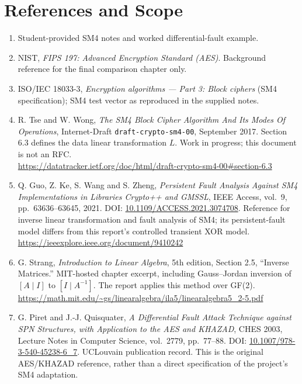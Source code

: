 \chapter*{References and Scope}
\begin{enumerate}
\raggedright
\item Student-provided SM4 notes and worked differential-fault example.
\item NIST, \emph{FIPS 197: Advanced Encryption Standard (AES)}. Background reference for the final comparison chapter only.
\item ISO/IEC 18033-3, \emph{Encryption algorithms --- Part 3: Block ciphers} (SM4 specification); SM4 test vector as reproduced in the supplied notes.
\item R. Tse and W. Wong, \emph{The SM4 Block Cipher Algorithm And Its Modes Of Operations}, Internet-Draft \texttt{draft-crypto-sm4-00}, September 2017. Section 6.3 defines the data linear transformation $L$. Work in progress; this document is not an RFC.\\
\url{https://datatracker.ietf.org/doc/html/draft-crypto-sm4-00#section-6.3}
\item Q. Guo, Z. Ke, S. Wang and S. Zheng, \emph{Persistent Fault Analysis Against SM4 Implementations in Libraries Crypto++ and GMSSL}, IEEE Access, vol.~9, pp.~63636--63645, 2021. DOI: \href{https://doi.org/10.1109/ACCESS.2021.3074708}{10.1109/ACCESS.2021.3074708}. Reference for inverse linear transformation and fault analysis of SM4; its persistent-fault model differs from this report's controlled transient XOR model.\\
\url{https://ieeexplore.ieee.org/document/9410242}
\item G. Strang, \emph{Introduction to Linear Algebra}, 5th edition, Section 2.5, ``Inverse Matrices.'' MIT-hosted chapter excerpt, including Gauss--Jordan inversion of $[A\mid I]$ to $[I\mid A^{-1}]$. The report applies this method over GF(2).\\
\url{https://math.mit.edu/~gs/linearalgebra/ila5/linearalgebra5_2-5.pdf}
\item G. Piret and J.-J. Quisquater, \emph{A Differential Fault Attack Technique against SPN Structures, with Application to the AES and KHAZAD}, CHES 2003, Lecture Notes in Computer Science, vol.~2779, pp.~77--88. DOI: \href{https://doi.org/10.1007/978-3-540-45238-6_7}{10.1007/978-3-540-45238-6\_7}. UCLouvain publication record. This is the original AES/KHAZAD reference, rather than a direct specification of the project's SM4 adaptation.\\

\end{enumerate}
